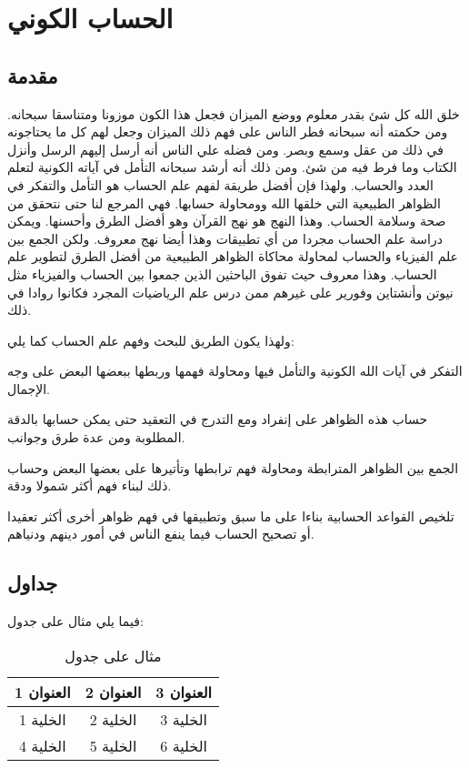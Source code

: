 \chapter{الحساب الكوني}


\section{مقدمة}

خلق الله كل شئ بقدر معلوم ووضع الميزان فجعل هذا الكون موزونا ومتناسقا سبحانه. ومن حكمته أنه سبحانه فطر الناس على فهم ذلك الميزان وجعل لهم كل ما يحتاجونه في ذلك من عقل وسمع وبصر. ومن فضله علي الناس أنه أرسل إليهم الرسل وأنزل الكتاب وما فرط فيه من شئ. ومن ذلك أنه أرشد سبحانه التأمل في آياته الكونية لتعلم العدد والحساب. ولهذا فإن أفضل طريقة لفهم علم الحساب هو التأمل والتفكر في الظواهر الطبيعية التي خلقها الله وومحاولة حسابها. فهي المرجع لنا حتى نتحقق من صحة وسلامة الحساب. وهذا النهج هو نهج القرآن وهو أفضل الطرق وأحسنها. ويمكن دراسة علم الحساب مجردا من أي تطبيقات وهذا أيضا نهج معروف. ولكن الجمع بين علم الفيزياء والحساب لمحاولة محاكاة الظواهر الطبيعية من أفضل الطرق لتطوير علم الحساب. وهذا معروف حيث تفوق الباحثين الذين جمعوا بين الحساب والفيزياء مثل نيوتن وأنشتاين وفورير على غيرهم ممن درس علم الرياضيات المجرد فكانوا روادا في ذلك.

ولهذا يكون الطريق للبحث وفهم علم الحساب كما يلي:
\begin{compactenum}
  \item التفكر في آيات الله الكونية والتأمل فيها ومحاولة فهمها وربطها ببعضها البعض على وجه الإجمال.
  \item حساب هذه الظواهر على إنفراد ومع التدرج في التعقيد حتى يمكن حسابها بالدقة المطلوبة ومن عدة طرق وجوانب.
  \item الجمع بين الظواهر المترابطة ومحاولة فهم ترابطها وتأتيرها على بعضها البعض وحساب ذلك لبناء فهم أكثر شمولا ودقة.
  \item تلخيص القواعد الحسابية بناءا على ما سبق وتطبيقها في فهم ظواهر أخرى أكثر تعقيدا أو تصحيح الحساب فيما ينفع الناس في أمور دينهم ودنياهم.
\end{compactenum}



\section{جداول}
فيما يلي مثال على جدول:

\begin{table}[h]
  \centering
  \begin{tabular}{|c|c|c|}
    \hline
    العنوان 1 & العنوان 2 & العنوان 3 \\
    \hline
    الخلية 1  & الخلية 2  & الخلية 3  \\
    \hline
    الخلية 4  & الخلية 5  & الخلية 6  \\
    \hline
  \end{tabular}
  \caption{مثال على جدول}
\end{table}


